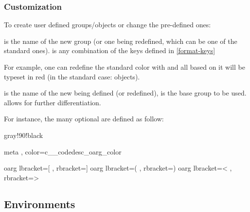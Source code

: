\documentclass{article}
\begin{document}
\subsubsection{Customization}\label{format-custom}

To create  user defined groups/objects or change the pre-defined ones:


\begin{codedescribe}[code,new=2023/05/16]{}
\begin{codesyntax} %
\end{codesyntax}
 is the name of the new group (or one being redefined, which can be one of the standard ones).  is any combination of the keys defined in \ref{format-keys}
\end{codedescribe}

For example, one can redefine the  standard color with  and all  based on it will be typeset in red (in the standard case:  objects).


\begin{codedescribe}[code,new=2023/05/16]{}
\begin{codesyntax} %
\end{codesyntax}
 is the name of the new  being defined (or redefined),
 is the base group to be used.  allows for further differentiation.
\end{codedescribe}
For instance, the many optional  are defined as follow:
\begin{codestore}
 { gray!90!black }

 { meta , color=c__codedesc_oarg_color }

 {oarg} { lbracket={[} , rbracket={]} }
 {oarg} { lbracket={(} , rbracket={)} }
 {oarg} { lbracket={<} , rbracket={>} }
\end{codestore}

\subsection{Environments}
\end{document}
